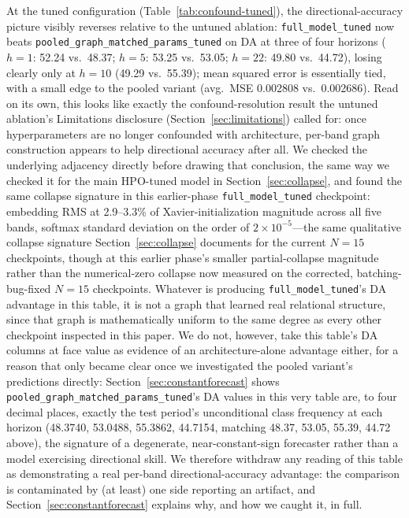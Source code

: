 \documentclass[journal]{IEEEtran}
\begin{document}
At the tuned configuration (Table~\ref{tab:confound-tuned}), the directional-accuracy picture visibly reverses relative to the untuned ablation: \texttt{full\_model\_tuned} now beats \texttt{pooled\_graph\_matched\_params\_tuned} on DA at three of four horizons ($h=1$: 52.24 vs.\ 48.37; $h=5$: 53.25 vs.\ 53.05; $h=22$: 49.80 vs.\ 44.72), losing clearly only at $h=10$ (49.29 vs.\ 55.39); mean squared error is essentially tied, with a small edge to the pooled variant (avg.\ MSE 0.002808 vs.\ 0.002686). Read on its own, this looks like exactly the confound-resolution result the untuned ablation's Limitations disclosure (Section~\ref{sec:limitations}) called for: once hyperparameters are no longer confounded with architecture, per-band graph construction appears to help directional accuracy after all. We checked the underlying adjacency directly before drawing that conclusion, the same way we checked it for the main HPO-tuned model in Section~\ref{sec:collapse}, and found the same collapse signature in this earlier-phase \texttt{full\_model\_tuned} checkpoint: embedding RMS at 2.9--3.3\% of Xavier-initialization magnitude across all five bands, softmax standard deviation on the order of $2\times10^{-5}$---the same qualitative collapse signature Section~\ref{sec:collapse} documents for the current $N=15$ checkpoints, though at this earlier phase's smaller partial-collapse magnitude rather than the numerical-zero collapse now measured on the corrected, batching-bug-fixed $N=15$ checkpoints. Whatever is producing \texttt{full\_model\_tuned}'s DA advantage in this table, it is not a graph that learned real relational structure, since that graph is mathematically uniform to the same degree as every other checkpoint inspected in this paper. We do not, however, take this table's DA columns at face value as evidence of an architecture-alone advantage either, for a reason that only became clear once we investigated the pooled variant's predictions directly: Section~\ref{sec:constantforecast} shows \texttt{pooled\_graph\_matched\_params\_tuned}'s DA values in this very table are, to four decimal places, exactly the test period's unconditional class frequency at each horizon (48.3740, 53.0488, 55.3862, 44.7154, matching 48.37, 53.05, 55.39, 44.72 above), the signature of a degenerate, near-constant-sign forecaster rather than a model exercising directional skill. We therefore withdraw any reading of this table as demonstrating a real per-band directional-accuracy advantage: the comparison is contaminated by (at least) one side reporting an artifact, and Section~\ref{sec:constantforecast} explains why, and how we caught it, in full.
\end{document}
